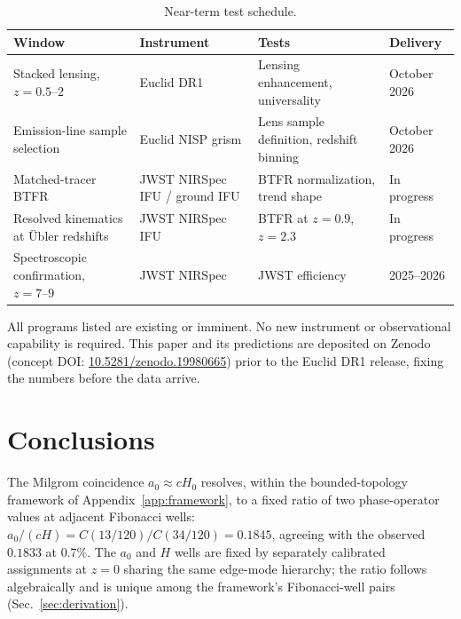 \documentclass[
    aps,
    prd,
    reprint,
    superscriptaddress,
    nofootinbib,
    floatfix
]{revtex4-2}
\begin{document}
\begin{table}[tb]
\caption{\label{tab:schedule}Near-term test schedule.}
\begin{ruledtabular}
\begin{tabular}{p{}p{}p{}p{}}
Window & Instrument & Tests & Delivery \\
\hline
Stacked lensing, $z = 0.5\text{--}2$
  & Euclid DR1
  & Lensing enhancement, universality
  & October 2026 \\
Emission-line sample selection
  & Euclid NISP grism
  & Lens sample definition, redshift binning
  & October 2026 \\
Matched-tracer BTFR
  & JWST NIRSpec IFU / ground IFU
  & BTFR normalization, trend shape
  & In progress \\
Resolved kinematics at \"Ubler redshifts
  & JWST NIRSpec IFU
  & BTFR at $z = 0.9$, $z = 2.3$
  & In progress \\
Spectroscopic confirmation, $z = 7\text{--}9$
  & JWST NIRSpec
  & JWST efficiency
  & 2025--2026 \\
\end{tabular}
\end{ruledtabular}
\end{table}

All programs listed are existing or imminent. No new instrument or
observational capability is required. This paper and its predictions
are deposited on Zenodo (concept DOI:
\href{https://doi.org/10.5281/zenodo.19980665}{10.5281/zenodo.19980665})
prior to the Euclid DR1 release, fixing the numbers before the data
arrive.

\section{Conclusions}
\label{sec:conclusions}

The Milgrom coincidence $a_0 \approx cH_0$ resolves, within the
bounded-topology framework of Appendix~\ref{app:framework}, to a
fixed ratio of two phase-operator values at adjacent Fibonacci wells:
$a_0/(cH) = C(13/120)/C(34/120) = 0.1845$, agreeing with the observed
$0.1833$ at $0.7\%$. The $a_0$ and $H$ wells are fixed by separately
calibrated assignments at $z = 0$ sharing the same edge-mode
hierarchy; the ratio follows algebraically and is unique among the
framework's Fibonacci-well pairs (Sec.~\ref{sec:derivation}).
\end{document}
